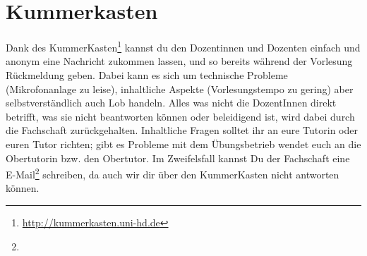 \section{Kummerkasten}
\label{kummerkasten}

Dank des KummerKasten\footnote{\url{http://kummerkasten.uni-hd.de}} kannst du den Dozentinnen und Dozenten einfach und anonym eine Nachricht zukommen lassen, und so bereits während der Vorlesung Rückmeldung geben. Dabei kann es sich um technische Probleme (Mikrofonanlage zu leise), inhaltliche Aspekte (Vorlesungstempo zu gering) aber selbstverständlich auch Lob handeln. Alles was nicht die DozentInnen direkt betrifft, was sie nicht beantworten können oder beleidigend ist, wird dabei durch die Fachschaft zurückgehalten. Inhaltliche Fragen solltet ihr an eure Tutorin oder euren Tutor richten; gibt es Probleme mit dem Übungsbetrieb wendet euch an die Obertutorin bzw. den Obertutor. Im Zweifelsfall kannst Du der Fachschaft eine E-Mail\footnote{} schreiben, da auch wir dir über den KummerKasten nicht antworten können.
